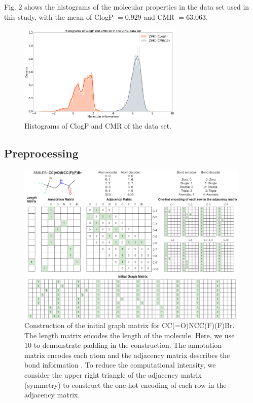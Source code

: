 Fig. 2 shows the histograms of the molecular properties in the data set used in this study, with the mean of ClogP $= 0.929$ and CMR $=63.063$.
\begin{figure}[htbp]
    \centerline{\includegraphics[width=0.7\textwidth]{fig2.png}}
    \caption{Histograms of ClogP and CMR of the data set.}
    \label{fig}
\end{figure}

\subsection{Preprocessing}

\begin{figure}
    \centering
    \includegraphics[width=1\textwidth]{fig3.png}
    \caption{Construction of the initial graph matrix for CC(=O)NCC(F)(F)Br. The length matrix encodes the length of the molecule. Here, we use 10 to demonstrate padding in the construction. The annotation matrix encodes each atom and the adjacency matrix describes the bond information \cite{lee2022mgcvae}. To reduce the computational intensity, we consider the upper right triangle of the adjacency matrix (symmetry) to construct the one-hot encoding of each row in the adjacency matrix.}
    \label{fig:img1}
\end{figure}

